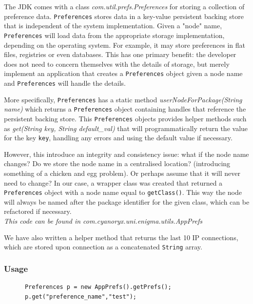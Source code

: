   The JDK comes with a class \emph{com.util.prefs.Preferences} for storing a collection of preference data. \verb!Preferences! stores data in a key-value persistent backing store that is independent of the system implementation. Given a "node" name, \verb!Preferences! will load data from the appropriate storage implementation, depending on the operating system. For example, it may store preferences in flat files, registries or even databases. This has one primary benefit: the developer does not need to concern themselves with the details of storage, but merely implement an application that creates a \verb!Preferences! object given a node name and \verb!Preferences! will handle the details.
  
  More specifically, \verb!Preferences! has a static method \emph{userNodeForPackage(String name)} which returns a \verb!Preferences! object containing handles that reference the persistent backing store. This \verb!Preferences! objects provides helper methods such as \emph{get(String key, String default\_val)} that will programmatically return the value for the key \verb!key!, handling any errors and using the default value if necessary. 
  
  However, this introduce an integrity and consistency issue: what if the node name changes? Do we store the node name in a centralised location? (introducing something of a chicken and egg problem). Or perhaps assume that it will never need to change? In our case, a wrapper class was created that returned a \verb!Preferences! object with a node name equal to \verb!getClass()!. This way the node will always be named after the package identifier for the given class, which can be refactored if necessary. \\
  
  
  
  \emph{This code can be found in com.cyanoryx.uni.enigma.utils.AppPrefs}
  
  We have also written a helper method that returns the last 10 IP connections, which are stored upon connection as a concatenated \verb!String! array.
  
    \subsubsection{Usage}
    
    \begin{lstlisting}
      Preferences p = new AppPrefs().getPrefs();
      p.get("preference_name","test");
    \end{lstlisting}
  
